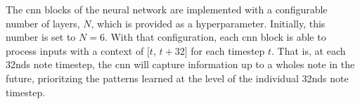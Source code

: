 
The \gls{cnn} blocks of the neural network are implemented
with a configurable number of layers, $N$, which is provided
as a hyperparameter. Initially, this number is set to $N=6$.
With that configuration, each \gls{cnn} block is able to
process inputs with a context of $[t$, $t + 32]$ for each
timestep $t$. That is, at each \glspl{32nd} note timestep, the
\gls{cnn} will capture information up to a \glspl{whole} note
in the future, prioritzing the patterns learned at the level
of the individual \glspl{32nd} note timestep.
